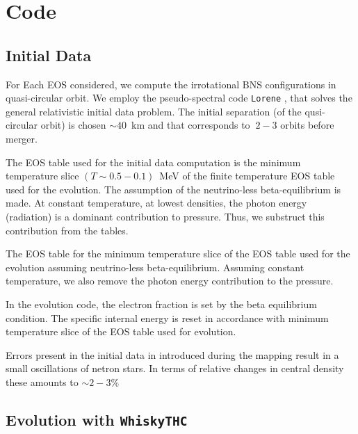 

\section{Code}


\subsection{Initial Data}

For Each EOS considered, we compute the irrotational BNS configurations in quasi-circular orbit.
We employ the pseudo-spectral code \texttt{Lorene} \citep{Gourgoulhon:2000nn}, that 
solves the general relativistic initial data problem.
The initial separation (of the qusi-circular orbit) is chosen $\sim40$~km and that corresponds to $~2-3$ orbits before merger.

The EOS table used for the initial data computation is the minimum temperature slice
$(T\sim 0.5 - 0.1)$~MeV of the finite temperature EOS table used for the evolution.
The assumption of the neutrino-less beta-equilibrium is made.
At constant temperature, at lowest densities, the photon energy (radiation) is a dominant contribution to 
pressure. Thus, we substruct this contribution from the tables.

The EOS table for the minimum temperature slice of the EOS table used for the evolution assuming neutrino-less beta-equilibrium.
Assuming constant temperature, we also remove the photon energy contribution to the pressure.

In the evolution code, the electron fraction is set by the beta equilibrium condition. 
The specific internal energy is reset in accordance with minimum temperature slice of the EOS table used for evolution.

Errors present in the initial data in introduced during the mapping result in a small oscillations of netron stars.
In terms of relative changes in central density these amounts to $\sim2-3\%$ \cite{Radice:2018pdn}


\subsection{Evolution with \texttt{WhiskyTHC}}


